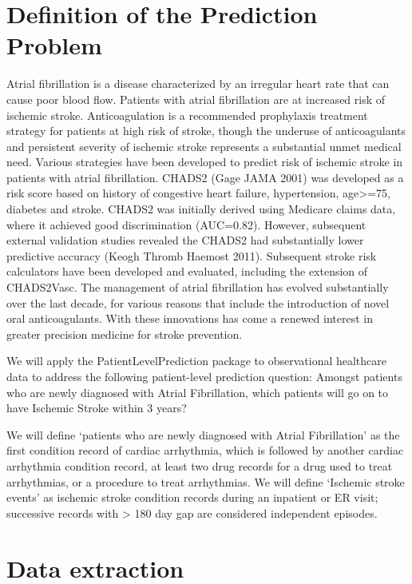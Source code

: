 \documentclass[]{article}
\begin{document}
\newpage

\section{Definition of the Prediction
Problem}\label{definition-of-the-prediction-problem}

Atrial fibrillation is a disease characterized by an irregular heart
rate that can cause poor blood flow. Patients with atrial fibrillation
are at increased risk of ischemic stroke. Anticoagulation is a
recommended prophylaxis treatment strategy for patients at high risk of
stroke, though the underuse of anticoagulants and persistent severity of
ischemic stroke represents a substantial unmet medical need. Various
strategies have been developed to predict risk of ischemic stroke in
patients with atrial fibrillation. CHADS2 (Gage JAMA 2001) was developed
as a risk score based on history of congestive heart failure,
hypertension, age\textgreater{}=75, diabetes and stroke. CHADS2 was
initially derived using Medicare claims data, where it achieved good
discrimination (AUC=0.82). However, subsequent external validation
studies revealed the CHADS2 had substantially lower predictive accuracy
(Keogh Thromb Haemost 2011). Subsequent stroke risk calculators have
been developed and evaluated, including the extension of CHADS2Vasc. The
management of atrial fibrillation has evolved substantially over the
last decade, for various reasons that include the introduction of novel
oral anticoagulants. With these innovations has come a renewed interest
in greater precision medicine for stroke prevention.

We will apply the PatientLevelPrediction package to observational
healthcare data to address the following patient-level prediction
question: Amongst patients who are newly diagnosed with Atrial
Fibrillation, which patients will go on to have Ischemic Stroke within 3
years?

We will define `patients who are newly diagnosed with Atrial
Fibrillation' as the first condition record of cardiac arrhythmia, which
is followed by another cardiac arrhythmia condition record, at least two
drug records for a drug used to treat arrhythmias, or a procedure to
treat arrhythmias. We will define `Ischemic stroke events' as ischemic
stroke condition records during an inpatient or ER visit; successive
records with \textgreater{} 180 day gap are considered independent
episodes.

\section{Data extraction}\label{data-extraction}
\end{document}

